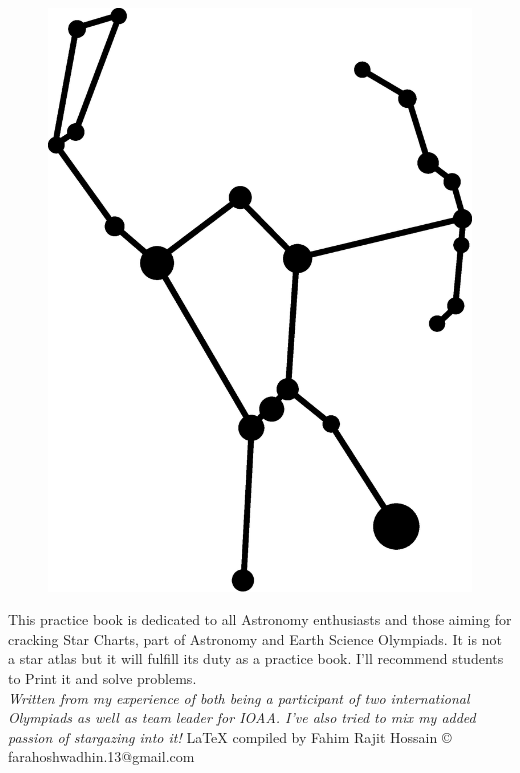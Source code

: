 \documentclass[a4paper,12pt]{extarticle}
\title{{\fontsize{30}{30}\selectfont\blue{\textbf{Star Charts 101 and Practices}}}}
\author{Fahim Rajit Hossain}
\date{\today}
\begin{document}
\begin{titlepage}
	\maketitle
	
	
\begin{figure}[H]
    \centering
    \includegraphics[width=0.4 \linewidth]{ori_1.eps}
\end{figure}
	
\vspace{2cm}
This practice book is dedicated to all Astronomy enthusiasts and those aiming for cracking Star Charts, part of Astronomy and Earth Science Olympiads. It is not a star atlas but it will fulfill its duty as a practice book. I'll recommend students to Print it and solve problems. \\

\textit{Written from my experience of both being a participant of two international Olympiads as well as team leader for IOAA. I've also tried to mix my added passion of stargazing into it!}
\vfill{\hfill \LaTeX  \;  compiled by \textsf{Fahim Rajit Hossain} \copyright{}}\\
\hfill farahoshwadhin.13@gmail.com
\end{titlepage}

\tableofcontents

\clearpage
\begin{abstract}
	{\color{blue} This note discusses the basic knowledge required to perform computations that accompany the study of the sky and it objects' positions in observational astronomy, in particular the naked eye observation. The discussion is based on practical examples, of gradually increasing complexity. Initially, it seems tough to memorize all the constellations and better at Observation round. Actually, you don't need to memorize everything. This book will help you systematically learn about the sky and solve problems like a puzzle.}
\end{abstract}
\end{document}
